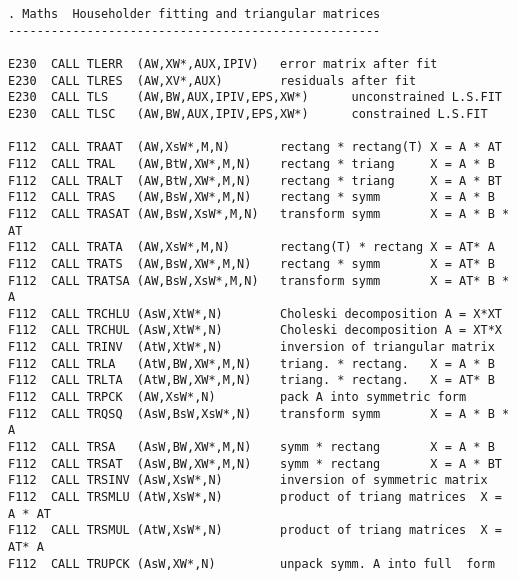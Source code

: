 \begin{verbatim}
. Maths  Householder fitting and triangular matrices
----------------------------------------------------

E230  CALL TLERR  (AW,XW*,AUX,IPIV)   error matrix after fit
E230  CALL TLRES  (AW,XV*,AUX)        residuals after fit
E230  CALL TLS    (AW,BW,AUX,IPIV,EPS,XW*)      unconstrained L.S.FIT
E230  CALL TLSC   (AW,BW,AUX,IPIV,EPS,XW*)      constrained L.S.FIT

F112  CALL TRAAT  (AW,XsW*,M,N)       rectang * rectang(T) X = A * AT
F112  CALL TRAL   (AW,BtW,XW*,M,N)    rectang * triang     X = A * B
F112  CALL TRALT  (AW,BtW,XW*,M,N)    rectang * triang     X = A * BT
F112  CALL TRAS   (AW,BsW,XW*,M,N)    rectang * symm       X = A * B
F112  CALL TRASAT (AW,BsW,XsW*,M,N)   transform symm       X = A * B * AT
F112  CALL TRATA  (AW,XsW*,M,N)       rectang(T) * rectang X = AT* A
F112  CALL TRATS  (AW,BsW,XW*,M,N)    rectang * symm       X = AT* B
F112  CALL TRATSA (AW,BsW,XsW*,M,N)   transform symm       X = AT* B * A
F112  CALL TRCHLU (AsW,XtW*,N)        Choleski decomposition A = X*XT
F112  CALL TRCHUL (AsW,XtW*,N)        Choleski decomposition A = XT*X
F112  CALL TRINV  (AtW,XtW*,N)        inversion of triangular matrix
F112  CALL TRLA   (AtW,BW,XW*,M,N)    triang. * rectang.   X = A * B
F112  CALL TRLTA  (AtW,BW,XW*,M,N)    triang. * rectang.   X = AT* B
F112  CALL TRPCK  (AW,XsW*,N)         pack A into symmetric form
F112  CALL TRQSQ  (AsW,BsW,XsW*,N)    transform symm       X = A * B * A
F112  CALL TRSA   (AsW,BW,XW*,M,N)    symm * rectang       X = A * B
F112  CALL TRSAT  (AsW,BW,XW*,M,N)    symm * rectang       X = A * BT
F112  CALL TRSINV (AsW,XsW*,N)        inversion of symmetric matrix
F112  CALL TRSMLU (AtW,XsW*,N)        product of triang matrices  X = A * AT
F112  CALL TRSMUL (AtW,XsW*,N)        product of triang matrices  X = AT* A
F112  CALL TRUPCK (AsW,XW*,N)         unpack symm. A into full  form
\end{verbatim}

